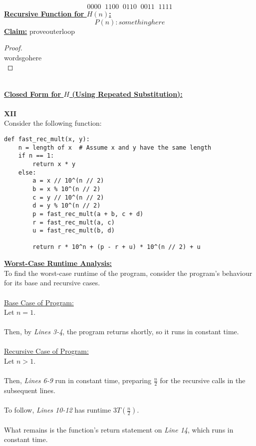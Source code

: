 \documentclass[12pt]{article}
\begin{document}
\[
0000 \;\; 1100 \;\; 0110 \;\; 0011 \;\; 1111
\]
\textbf{\underline{Recursive Function for $H(n)$:}} \\
\[P(n): somethinghere\]
\textbf{\underline{Claim:}} proveouterloop
\begin{proof}
\leavevmode\\
    wordsgohere \\
\end{proof}
\leavevmode\\
\textbf{\underline{Closed Form for $H$ (Using Repeated Substitution):}} \\
\\
\textbf{XII} \\
Consider the following function:
\begin{lstlisting}
def fast_rec_mult(x, y):
    n = length of x  # Assume x and y have the same length
    if n == 1:
        return x * y
    else:
        a = x // 10^(n // 2)
        b = x % 10^(n // 2)
        c = y // 10^(n // 2)
        d = y % 10^(n // 2)
        p = fast_rec_mult(a + b, c + d)
        r = fast_rec_mult(a, c)
        u = fast_rec_mult(b, d)

        return r * 10^n + (p - r + u) * 10^(n // 2) + u
\end{lstlisting}
\textbf{\underline{Worst-Case Runtime Analysis:}} \\
To find the worst-case runtime of the program, consider the program's behaviour for its base and recursive cases. \\
\\
\underline{Base Case of Program:} \\
Let $n = 1$. \\
\\
Then, by \textit{Lines 3-4}, the program returns shortly, so it runs in constant time. \\
\\
\underline{Recursive Case of Program:} \\
Let $n > 1$. \\
\\
Then, \textit{Lines 6-9} run in constant time, preparing $\frac{n}{2}$ for the recursive calls in the subsequent lines. \\
\\
To follow, \textit{Lines 10-12} has runtime $3T(\frac{n}{2})$. \\
\\
What remains is the function's return statement on \textit{Line 14}, which runs in constant time. \\
\end{document}
